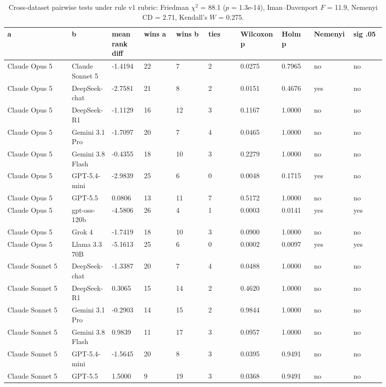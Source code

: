 \begin{landscape}
\tiny
\setlength{\tabcolsep}{3pt}
\begin{longtable}{p{0.162\linewidth}p{0.081\linewidth}p{0.081\linewidth}p{0.081\linewidth}p{0.081\linewidth}p{0.081\linewidth}p{0.081\linewidth}p{0.081\linewidth}p{0.081\linewidth}p{0.081\linewidth}}
\caption{Cross-dataset pairwise tests under rule v1 rubric: Friedman $\chi^2$ = 88.1 ($p$ = 1.3e-14), Iman--Davenport $F$ = 11.9, Nemenyi CD = 2.71, Kendall's $W$ = 0.275.}\label{tab:pairwise_v1_rubric}\\
\toprule
a & b & mean rank diff & wins a & wins b & ties & Wilcoxon p & Holm p & Nemenyi & sig .05 \\
\midrule
Claude Opus 5 & Claude Sonnet 5 & -1.4194 & 22 & 7 & 2 & 0.0275 & 0.7965 & no & no \\
Claude Opus 5 & DeepSeek-chat & -2.7581 & 21 & 8 & 2 & 0.0151 & 0.4676 & yes & no \\
Claude Opus 5 & DeepSeek-R1 & -1.1129 & 16 & 12 & 3 & 0.1167 & 1.0000 & no & no \\
Claude Opus 5 & Gemini 3.1 Pro & -1.7097 & 20 & 7 & 4 & 0.0465 & 1.0000 & no & no \\
Claude Opus 5 & Gemini 3.8 Flash & -0.4355 & 18 & 10 & 3 & 0.2279 & 1.0000 & no & no \\
Claude Opus 5 & GPT-5.4-mini & -2.9839 & 25 & 6 & 0 & 0.0048 & 0.1715 & yes & no \\
Claude Opus 5 & GPT-5.5 & 0.0806 & 13 & 11 & 7 & 0.5172 & 1.0000 & no & no \\
Claude Opus 5 & gpt-oss-120b & -4.5806 & 26 & 4 & 1 & 0.0003 & 0.0141 & yes & yes \\
Claude Opus 5 & Grok 4 & -1.7419 & 18 & 10 & 3 & 0.0900 & 1.0000 & no & no \\
Claude Opus 5 & Llama 3.3 70B & -5.1613 & 25 & 6 & 0 & 0.0002 & 0.0097 & yes & yes \\
Claude Sonnet 5 & DeepSeek-chat & -1.3387 & 20 & 7 & 4 & 0.0488 & 1.0000 & no & no \\
Claude Sonnet 5 & DeepSeek-R1 & 0.3065 & 15 & 14 & 2 & 0.4620 & 1.0000 & no & no \\
Claude Sonnet 5 & Gemini 3.1 Pro & -0.2903 & 14 & 15 & 2 & 0.9844 & 1.0000 & no & no \\
Claude Sonnet 5 & Gemini 3.8 Flash & 0.9839 & 11 & 17 & 3 & 0.0957 & 1.0000 & no & no \\
Claude Sonnet 5 & GPT-5.4-mini & -1.5645 & 20 & 8 & 3 & 0.0395 & 0.9491 & no & no \\
Claude Sonnet 5 & GPT-5.5 & 1.5000 & 9 & 19 & 3 & 0.0368 & 0.9491 & no & no \\

\end{longtable}
\end{landscape}
